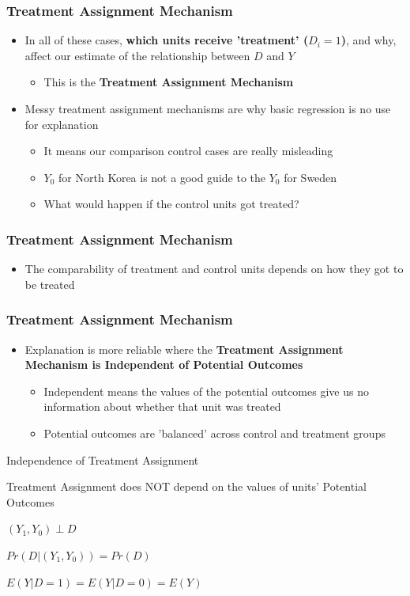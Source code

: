 \documentclass[xcolor=x11names,compress]{beamer}\usepackage[]{graphicx}\usepackage[]{color}
\renewcommand{\(}{\begin{columns}}
\renewcommand{\)}{\end{columns}}
\newcommand{\<}[1]{\begin{column}{#1}}
\renewcommand{\>}{\end{column}}
\begin{document}
\begin{frame}
\frametitle{Treatment Assignment Mechanism}
\begin{itemize}
\item In all of these cases, \textbf{which units receive 'treatment' ($D_i=1$)}, and why, affect our estimate of the relationship between $D$ and $Y$
\pause
\begin{itemize}
\item This is the \textbf{Treatment Assignment Mechanism}
\pause
\end{itemize}
\item Messy treatment assignment mechanisms are why basic regression is no use for explanation
\pause
\begin{itemize}
\item It means our comparison control cases are really misleading
\pause
\item $Y_0$ for North Korea is not a good guide to the $Y_0$ for Sweden
\pause
\item What would happen if the control units got treated?
\end{itemize}
\end{itemize}
\end{frame}


\begin{frame}
\frametitle{Treatment Assignment Mechanism}
\begin{itemize}
\item The comparability of treatment and control units depends on how they got to be treated
\pause
{}
\end{itemize}
\end{frame}

\begin{frame}
\frametitle{Treatment Assignment Mechanism}
\begin{itemize}
\item Explanation is more reliable where the \textbf{Treatment Assignment Mechanism is Independent of Potential Outcomes}
\pause
\begin{itemize}
\item Independent means the values of the potential outcomes give us no information about whether that unit was treated
\pause
\item Potential outcomes are 'balanced' across control and treatment groups
\pause
\end{itemize}
\end{itemize}
\begin{block}{Independence of Treatment Assignment}
\item Treatment Assignment does NOT depend on the values of units' Potential Outcomes
\pause 
\item $(Y_1,Y_0) \perp D$
\pause
\item $Pr(D|(Y_1,Y_0)) = Pr(D)$
\pause
\item $E(Y|D=1) = E(Y|D=0) = E(Y)$
\end{block}
\end{frame}
\end{document}
